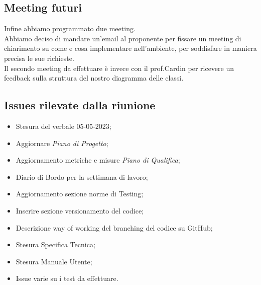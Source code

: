\subsection{Meeting futuri}
Infine abbiamo programmato due meeting.\\
Abbiamo deciso di mandare un'email al proponente per fissare un meeting di chiarimento su come e cosa implementare nell'ambiente, per soddisfare in maniera precisa le sue richieste.\\
Il secondo meeting da effettuare è invece con il prof.Cardin per ricevere un feedback sulla struttura del nostro diagramma delle classi.
\subsection{Issues rilevate dalla riunione}
\begin{itemize}
    \item Stesura del verbale 05-05-2023;
    \item Aggiornare \textit{Piano di Progetto};    
    \item Aggiornamento metriche e misure \textit{Piano di Qualifica};
    \item Diario di Bordo per la settimana di lavoro;
    \item Aggiornamento sezione norme di Testing;
    \item Inserire sezione versionamento del codice;
    \item Descrizione way of working del branching del codice su GitHub;
    \item Stesura Specifica Tecnica;
    \item Stesura Manuale Utente;
    \item Issue varie su i test da effettuare.
\end{itemize}